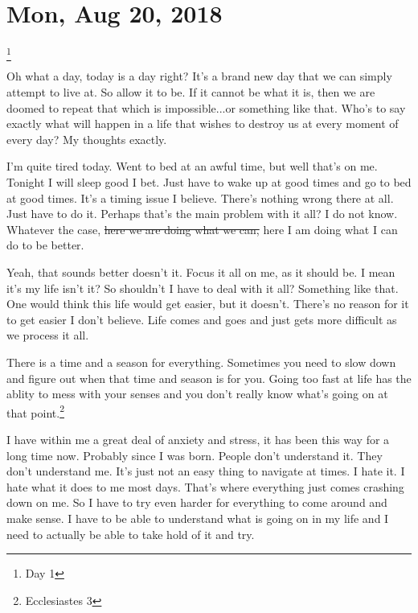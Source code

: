 \section{Mon, Aug 20, 2018}\footnote{Day 1}

Oh what a day, today is a day right? It's a brand new day that we can simply attempt
to live at. So allow it to be. If it cannot be what it is, then we are doomed to
repeat that which is impossible...or something like that. Who's to say exactly what
will happen in a life that wishes to destroy us at every moment of every day? My
thoughts exactly.

I'm quite tired today. Went to bed at an awful time, but well that's on me. Tonight I
will sleep good I bet. Just have to wake up at good times and go to bed at good
times. It's a timing issue I believe. There's nothing wrong there at all. Just have
to do it. Perhaps that's the main problem with it all? I do not know. Whatever the
case, \st{here we are doing what we can,} here I am doing what I can do to be better.

Yeah, that sounds better doesn't it. Focus it all on me, as it should be. I mean it's
my life isn't it? So shouldn't I have to deal with it all? Something like that. One
would think this life would get easier, but it doesn't. There's no reason for it to
get easier I don't believe. Life comes and goes and just gets more difficult as we
process it all.

There is a time and a season for everything. Sometimes you need to slow down and
figure out when that time and season is for you. Going too fast at life has the
ablity to mess with your senses and you don't really know what's going on at that
point.\footnote{Ecclesiastes 3}

I have within me a great deal of anxiety and stress, it has been this way for a long
time now. Probably since I was born. People don't understand it. They don't
understand me. It's just not an easy thing to navigate at times. I hate it. I hate
what it does to me most days. That's where everything just comes crashing down on me.
So I have to try even harder for everything to come around and make sense. I have to
be able to understand what is going on in my life and I need to actually be able to
take hold of it and try.